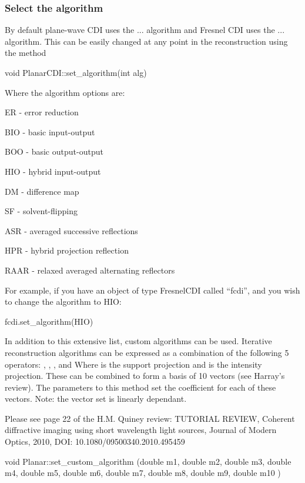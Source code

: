\documentclass[]{nadia}
\begin{document}
\subsubsection{Select the algorithm}

By default plane-wave CDI uses the ... algorithm and Fresnel CDI uses
the ... algorithm. This can be easily changed at any point in the
reconstruction using the method

\begin{myverbatim}
void PlanarCDI::set_algorithm(int alg) 	
\end{myverbatim}
Where the algorithm options are:
\begin{description} 
\item ER - error reduction 
\item BIO - basic input-output 
\item BOO - basic output-output 
\item HIO - hybrid input-output 
\item DM - difference map 
\item SF - solvent-flipping 
\item ASR - averaged successive reflections 
\item HPR - hybrid projection reflection 
\item RAAR - relaxed averaged alternating reflectors
\end{description}

For example, if you have an object of type FresnelCDI called ``fcdi'', and
you wish to change the algorithm to HIO:
\begin{myverbatim}
fcdi.set_algorithm(HIO) 	
\end{myverbatim}

In addition to this extensive list, custom algorithms can be
used. Iterative reconstruction algorithms can be expressed as a
combination of the following 5 operators: , , , and Where is the
support projection and is the intensity projection. These can be
combined to form a basis of 10 vectors (see Harray's review). The
parameters to this method set the coefficient for each of these
vectors. Note: the vector set is linearly dependant.

Please see page 22 of the H.M. Quiney review: TUTORIAL REVIEW,
Coherent diffractive imaging using short wavelength light sources,
Journal of Modern Optics, 2010, DOI: 10.1080/09500340.2010.495459

\begin{myverbatim}
void Planar::set_custom_algorithm (double m1,
double 	m2,
double 	m3,
double 	m4,
double 	m5,
double 	m6,
double 	m7,
double 	m8,
double 	m9,
double 	m10	 
)
\end{myverbatim}
			
\end{document}
